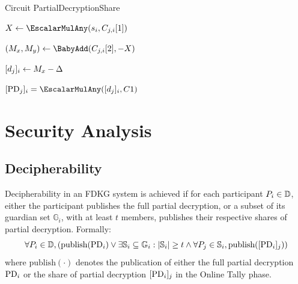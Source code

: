 \documentclass{article}
\begin{document}
\begin{algorithm}[H]
\caption{Circuit PartialDecryptionShare}
\label{alg:circuit_proof_pds}


\BlankLine

$X \leftarrow \EscalarMulAny(\PartySecretKey{i}, \EncryptedPartialDecryptionKeyShare{j}{i}[1])$\; %

$(M_x, M_y) \leftarrow \BabyAdd(\EncryptedPartialDecryptionKeyShare{j}{i}[2], - X)$\; %

$[d_{j}]_{i} \leftarrow M_x - \Delta$\;

\Assert $\SharePartialDecryptionFromTo{j}{i} = \EscalarMulAny(\PartialDecryptionKeyShare{j}{i}, \TotalA{})$
\end{algorithm}


\section{Security Analysis}


\subsection*{Decipherability}

\begin{definition}[Decipherability] \label{def:decipherability}
    Decipherability in an FDKG system is achieved if for each participant $P_{i} \in \mathbb{D}$, either the participant publishes the full partial decryption, or a subset of its guardian set $\mathbb{G}_i$, with at least $t$ members, publishes their respective shares of partial decryption. Formally: 
    \[
    \forall P_{i} \in \mathbb{D}, \left( \textrm{publish}(\mathrm{PD}_{i}) \lor \exists \mathbb{S}_i \subseteq \mathbb{G}_i : |\mathbb{S}_i| \geq t \land \forall P_{j} \in \mathbb{S}_i, \textrm{publish}([\mathrm{PD}_{i}]_{j}) \right)
    \]
    where \(\textrm{publish}(\cdot)\) denotes the publication of either the full partial decryption $\mathrm{PD}_{i}$ or the share of partial decryption $[\mathrm{PD}_{i}]_{j}$ in the Online Tally phase.
\end{definition}
\end{document}
